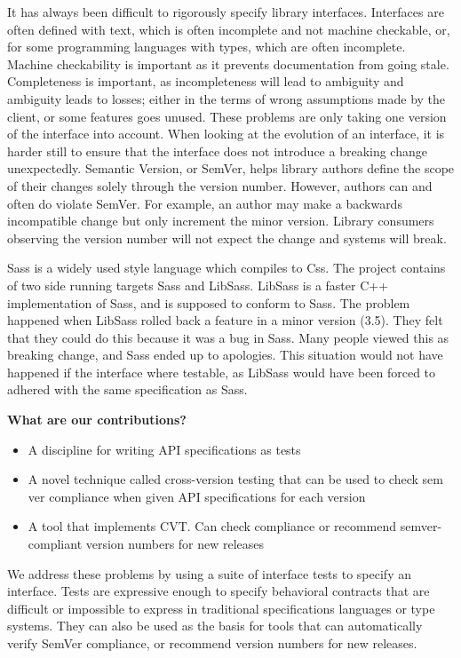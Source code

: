 It has always been difficult to rigorously specify library interfaces.
Interfaces are often defined with text, which is often incomplete and not
machine checkable, or, for some programming languages with types, which are
often incomplete. Machine checkability is important as it prevents
documentation from going stale. Completeness is important, as incompleteness
will lead to ambiguity and ambiguity leads to losses; either in the terms of
wrong assumptions made by the client, or some features goes unused. These
problems are only taking one version of the interface into account. When
looking at the evolution of an interface, it is harder still to ensure that the
interface does not introduce a breaking change unexpectedly. Semantic Version, or
SemVer, helps library authors define the scope of their changes solely through
the version number. However, authors can and often do violate SemVer. For
example, an author may make a backwards incompatible change but only increment
the minor version. Library consumers observing the version number will not
expect the change and systems will break. 

Sass is a widely used style language which compiles to Css. The project
contains of two side running targets Sass and LibSass. LibSass is a 
faster C++ implementation of Sass, and is supposed to conform to Sass. The
problem happened when LibSass rolled back a feature in a minor version (3.5). 
They felt that they could do this because it was a bug in Sass. Many people 
viewed this as breaking change, and Sass ended up to apologies. This situation
would not have happened if the interface where testable, as LibSass would have
been forced to adhered with the same specification as Sass\cite{libsass}. 
%


{\bf What are our contributions?}
\begin{itemize}
\item A discipline for writing API specifications as tests
\item A novel technique called cross-version testing that can be used
  to check sem ver compliance when given API specifications for each
  version
\item A tool that implements CVT. Can check compliance or recommend
  semver-compliant version numbers for new releases
\end{itemize}

We address these problems by using a suite of interface tests to
specify an interface. Tests are expressive enough to specify
behavioral contracts that are difficult or impossible to express in
traditional specifications languages or type systems. They can also be
used as the basis for tools that can automatically verify SemVer
compliance, or recommend version numbers for new releases.

